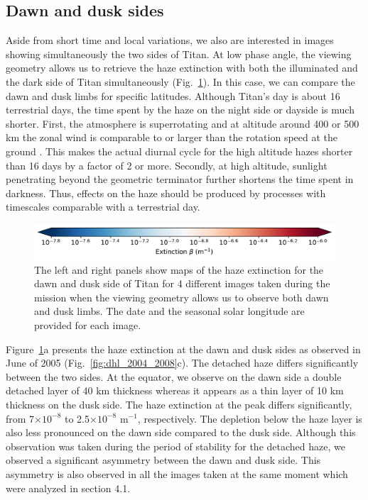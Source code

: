 \subsection{Dawn and dusk sides}

Aside from short time and local variations, we also are interested in images showing simultaneously the two sides
of Titan. At low phase angle, the viewing geometry allows us to retrieve the haze extinction with both the
illuminated and the dark side of Titan simultaneously  (Fig.~\ref{fig:dawn_dusk}).
In this case, we can compare the dawn and dusk limbs for
specific latitudes. Although Titan's day is about 16 terrestrial
days, the time spent by the haze on the night side or dayside is much shorter.
First, the atmosphere is superrotating and at altitude around 400 or 500 km the zonal wind is comparable to or
larger than the rotation speed at the ground \citep{Flasar2005, Achterberg2011, Lebonnois2012, Lellouch2019}.
This makes the actual diurnal cycle for the high altitude hazes shorter than 16 days by a factor of 2 or more.
Secondly, at high altitude, sunlight penetrating beyond the geometric terminator further shortens the time spent in darkness.
Thus, effects on the haze should be produced by processes with timescales
comparable with a terrestrial day.

\begin{figure}[!ht]
\includegraphics[width=.5\textwidth]{Fig/Extinction_colorbar}
\caption{The left and right panels show maps of the haze extinction for the dawn and dusk side of
Titan for 4 different images taken during the mission when the viewing geometry allows us to observe both dawn and dusk
limbs. The date and the seasonal solar longitude are provided for each image.}
\label{fig:dawn_dusk}
\end{figure}

Figure~\ref{fig:dawn_dusk}a presents the haze extinction at the dawn and dusk sides as observed
in June of 2005 (Fig.~\ref{fig:dhl_2004_2008}c). The detached haze differs significantly between the two sides.
At the equator, we observe on the dawn side a double detached layer of 40 km thickness whereas it appears
as a thin layer of 10 km thickness on the dusk side. The haze extinction at the peak differs significantly,
from 7$\times 10^{-8}$ to 2.5$\times 10^{-8}$ m$^{-1}$, respectively. The depletion below the haze layer
is also less pronounced on the dawn side compared to the dusk side. Although this observation was taken
during the period of stability for the detached haze, we observed a significant asymmetry between
the dawn and dusk side. This asymmetry is also observed in all the images taken at the same moment which were
analyzed in section 4.1.

